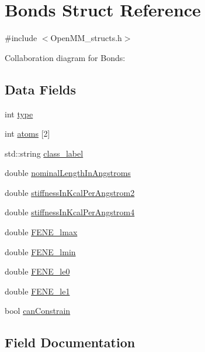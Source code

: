 \hypertarget{structBonds}{}\section{Bonds Struct Reference}
\label{structBonds}


{\ttfamily \#include $<$Open\+M\+M\+\_\+structs.\+h$>$}



Collaboration diagram for Bonds\+:
\subsection*{Data Fields}
\begin{DoxyCompactItemize}
\item 
int \mbox{\hyperlink{structBonds_a888b86b64e111ca2c1cdc57ab3f1e575}{type}}
\item 
int \mbox{\hyperlink{structBonds_a8a34bb278b19d3695b27e9863025b9ff}{atoms}} \mbox{[}2\mbox{]}
\item 
std\+::string \mbox{\hyperlink{structBonds_aa2ab521cee97c73716b5fec929486a84}{class\+\_\+label}}
\item 
double \mbox{\hyperlink{structBonds_ae3486b916a2b9b1b850441062503f3b3}{nominal\+Length\+In\+Angstroms}}
\item 
double \mbox{\hyperlink{structBonds_a9b3712d34cadf4b451349b0ac76597d5}{stiffness\+In\+Kcal\+Per\+Angstrom2}}
\item 
double \mbox{\hyperlink{structBonds_a0780dfadea7787128aca962f5e5c57a1}{stiffness\+In\+Kcal\+Per\+Angstrom4}}
\item 
double \mbox{\hyperlink{structBonds_a63e86c906c80c0cdee48220ca47d8699}{F\+E\+N\+E\+\_\+lmax}}
\item 
double \mbox{\hyperlink{structBonds_aac40730c3bc80ea9331a7be2e5c4cfe4}{F\+E\+N\+E\+\_\+lmin}}
\item 
double \mbox{\hyperlink{structBonds_a4fe207829fdd685735e9ab4e91bb7567}{F\+E\+N\+E\+\_\+le0}}
\item 
double \mbox{\hyperlink{structBonds_a19217ee754badd8854095ec67df90df9}{F\+E\+N\+E\+\_\+le1}}
\item 
bool \mbox{\hyperlink{structBonds_a2bb39aa55db302247ccb0e058c03bf63}{can\+Constrain}}
\end{DoxyCompactItemize}


\subsection{Field Documentation}
\mbox{\label{structBonds_a8a34bb278b19d3695b27e9863025b9ff}} 

